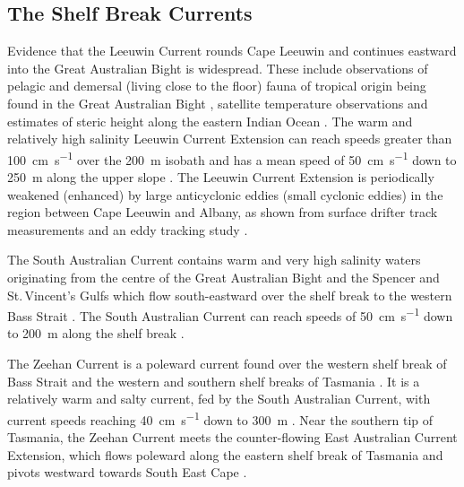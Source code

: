 \documentclass[preprint,3p,review,12pt]{elsarticle}
\begin{document}
\subsection{The Shelf Break Currents} \label{The Shelf Break Currents}
Evidence that the Leeuwin Current rounds Cape Leeuwin and continues eastward into the Great Australian Bight is widespread. These include observations of pelagic and demersal (living close to the floor) fauna of tropical origin being found in the Great Australian Bight \citep{Garrey1981}, satellite temperature observations \citep{Legeckis1981} and estimates of steric height along the eastern Indian Ocean \citep{Godfrey1985}. The warm and relatively high salinity Leeuwin Current Extension can reach speeds greater than \SI{100}{\centi\meter\per\second} over the \SI{200}{\meter} isobath \citep{Cresswell1993} and has a mean speed of \SI{50}{\centi\meter\per\second} down to \SI{250}{\meter} along the upper slope \citep{Cresswell2004}. The Leeuwin Current Extension is periodically weakened (enhanced) by large anticyclonic eddies (small cyclonic eddies) in the region between Cape Leeuwin and Albany, as shown from surface drifter track measurements \citep{Godfrey1986} and an eddy tracking study \citep{Cresswell2004}.

The South Australian Current contains warm and very high salinity waters originating from the centre of the Great Australian Bight \citep{Rochford1986} and the Spencer and St.\,Vincent's Gulfs \citep{Godfrey1986} which flow south-eastward over the shelf break to the western Bass Strait \citep{Ridgway2004}. The South Australian Current can reach speeds of \SI{50}{\centi\meter\per\second} down to \SI{200}{\meter} along the shelf break \citep{Middleton2007}.

The Zeehan Current is a poleward current found over the western shelf break of Bass Strait and the western and southern shelf breaks of Tasmania  \citep{Baines1983,Thompson1983}. It is a relatively warm and salty current, fed by the South Australian Current, with current speeds reaching \SI{40}{\centi\meter\per\second} down to \SI{300}{\meter} \citep{Ridgway2007}. Near the southern tip of Tasmania, the Zeehan Current meets the counter-flowing East Australian Current Extension, which flows poleward along the eastern shelf break of Tasmania and pivots westward towards South East Cape \citep{Cresswell2000,Oliver2016}.
\end{document}
